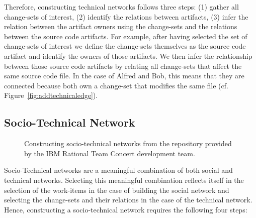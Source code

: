 Therefore, constructing technical networks follows three steps: (1) gather all change-sets of interest, (2) identify the relations between artifacts, (3) infer the relation between the artifact owners using the change-sets and the relations between the source code artifacts.
For example, after having selected the set of change-sets of interest we define the change-sets themselves as the source code artifact and identify the owners of those artifacts.
We then infer the relationship between those source code artifacts by relating all change-sets that affect the same source code file.
In the case of Alfred and Bob, this means that they are connected because both own a change-set that modifies the same file (cf. Figure~\ref{fig:addtechnicaledge}).

\subsection{Socio-Technical Network}
\begin{figure}[t!]
%	
  \centering
  \hspace{8pt}
  
    \hspace{8pt}
  \caption{Constructing socio-technical networks from the repository provided by the IBM Rational Team Concert development team.}
  \label{fig:construct-stc}
\end{figure}

Socio-Technical networks are a meaningful combination of both social and technical networks.
Selecting this meaningful combination reflects itself in the selection of the work-items in the case of building the social network and selecting the change-sets and their relations in the case of the technical network.
Hence, constructing a socio-technical network requires the following four steps:

